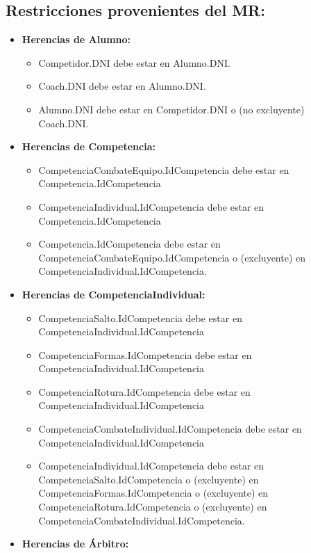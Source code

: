 \subsection{Restricciones provenientes del MR:}
\begin{itemize}
    \item \textbf{Herencias de Alumno:}
    \begin{itemize}
        \item Competidor.DNI debe estar en Alumno.DNI.
        \item Coach.DNI debe estar en Alumno.DNI.
        \item Alumno.DNI debe estar en Competidor.DNI o (no excluyente) Coach.DNI.
    \end{itemize}
    \item \textbf{Herencias de Competencia:}
    \begin{itemize}
        \item CompetenciaCombateEquipo.IdCompetencia debe estar en Competencia.IdCompetencia
        \item CompetenciaIndividual.IdCompetencia debe estar en Competencia.IdCompetencia
        \item Competencia.IdCompetencia debe estar en CompetenciaCombateEquipo.IdCompetencia o (excluyente) en CompetenciaIndividual.IdCompetencia.
    \end{itemize}
    \item \textbf{Herencias de CompetenciaIndividual:}
    \begin{itemize}
        \item CompetenciaSalto.IdCompetencia debe estar en CompetenciaIndividual.IdCompetencia
        \item CompetenciaFormas.IdCompetencia debe estar en CompetenciaIndividual.IdCompetencia
        \item CompetenciaRotura.IdCompetencia debe estar en CompetenciaIndividual.IdCompetencia
        \item CompetenciaCombateIndividual.IdCompetencia debe estar en CompetenciaIndividual.IdCompetencia
        \item CompetenciaIndividual.IdCompetencia debe estar en CompetenciaSalto.IdCompetencia o (excluyente) en CompetenciaFormas.IdCompetencia o (excluyente) en CompetenciaRotura.IdCompetencia o (excluyente) en CompetenciaCombateIndividual.IdCompetencia.
    \end{itemize}
    \item \textbf{Herencias de Árbitro:}
    \begin{itemize}

\end{itemize}
\end{itemize}

